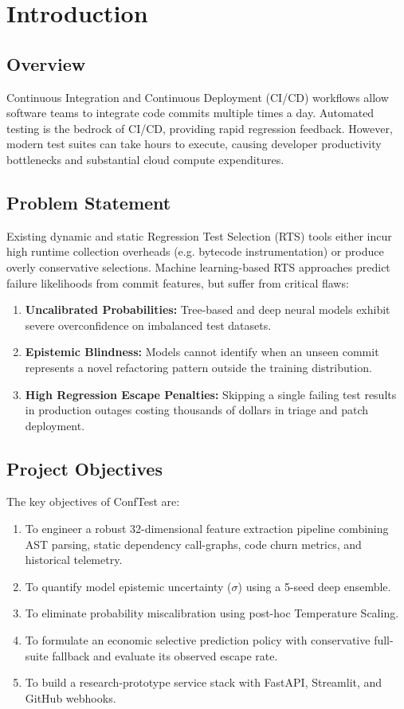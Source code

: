 \chapter{Introduction}

\section{Overview}
Continuous Integration and Continuous Deployment (CI/CD) workflows allow software teams to integrate code commits multiple times a day. Automated testing is the bedrock of CI/CD, providing rapid regression feedback. However, modern test suites can take hours to execute, causing developer productivity bottlenecks and substantial cloud compute expenditures.

\section{Problem Statement}
Existing dynamic and static Regression Test Selection (RTS) tools either incur high runtime collection overheads (e.g. bytecode instrumentation) or produce overly conservative selections. Machine learning-based RTS approaches predict failure likelihoods from commit features, but suffer from critical flaws:
\begin{enumerate}
    \item \textbf{Uncalibrated Probabilities:} Tree-based and deep neural models exhibit severe overconfidence on imbalanced test datasets.
    \item \textbf{Epistemic Blindness:} Models cannot identify when an unseen commit represents a novel refactoring pattern outside the training distribution.
    \item \textbf{High Regression Escape Penalties:} Skipping a single failing test results in production outages costing thousands of dollars in triage and patch deployment.
\end{enumerate}

\section{Project Objectives}
The key objectives of ConfTest are:
\begin{enumerate}
    \item To engineer a robust 32-dimensional feature extraction pipeline combining AST parsing, static dependency call-graphs, code churn metrics, and historical telemetry.
    \item To quantify model epistemic uncertainty ($\sigma$) using a 5-seed deep ensemble.
    \item To eliminate probability miscalibration using post-hoc Temperature Scaling.
    \item To formulate an economic selective prediction policy with conservative full-suite fallback and evaluate its observed escape rate.
    \item To build a research-prototype service stack with FastAPI, Streamlit, and GitHub webhooks.
\end{enumerate}

